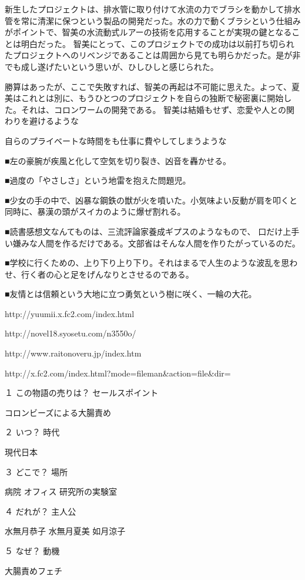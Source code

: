 新生したプロジェクトは、排水管に取り付けて水流の力でブラシを動かして排水管を常に清潔に保つという製品の開発だった。水の力で動くブラシという仕組みがポイントで、智美の水流動式ルアーの技術を応用することが実現の鍵となることは明白だった。
智美にとって、このプロジェクトでの成功は以前打ち切られたプロジェクトへのリベンジであることは周囲から見ても明らかだった。是が非でも成し遂げたいという思いが、ひしひしと感じられた。

勝算はあったが、ここで失敗すれば、智美の再起は不可能に思えた。よって、夏美はこれとは別に、もうひとつのプロジェクトを自らの独断で秘密裏に開始した。それは、コロンワームの開発である。
智美は結婚もせず、恋愛や人との関わりを避けるような

自らのプライベートな時間をも仕事に費やしてしまうような



■左の豪腕が疾風と化して空気を切り裂き、凶音を轟かせる。

■過度の「やさしさ」という地雷を抱えた問題児。

■少女の手の中で、凶暴な鋼鉄の獣が火を噴いた。小気味よい反動が肩を叩くと同時に、暴漢の頭がスイカのように爆ぜ割れる。

■読書感想文なんてものは、三流評論家養成ギプスのようなもので、
口だけ上手い嫌みな人間を作るだけである。文部省はそんな人間を作りたがっているのだ。

■学校に行くための、上り下り上り下り。それはまるで人生のような波乱を思わせ、行く者の心と足をげんなりとさせるのである。

■友情とは信頼という大地に立つ勇気という樹に咲く、一輪の大花。



http://yuumii.x.fc2.com/index.html

http://novel18.syosetu.com/n3550o/

http://www.raitonoveru.jp/index.htm


http://x.fc2.com/index.html?mode=fileman&action=file&dir=


１	この物語の売りは？	セールスポイント

コロンビーズによる大腸責め

２	いつ？	時代

現代日本

３	どこで？	場所

病院
オフィス
研究所の実験室

４	だれが？	主人公

水無月恭子
水無月夏美
如月涼子

５	なぜ？	動機

大腸責めフェチ


